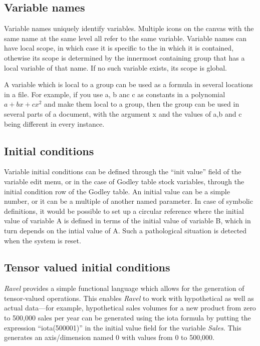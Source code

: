 \subsection{Variable names}

Variable names uniquely identify variables. Multiple icons on the
canvas with the same name at the same level all refer to the same
variable. Variable names can have local scope, in which case it
is specific to the  in which it is contained,
othewise its scope is determined by the innermost containing group
that has a local variable of that name. If no such variable exists,
its scope is global.

A variable which is local to a group can be used as a formula in
several locations in a file. For example, if you use a, b anc c as
constants in a polynomial $a+bx+cx^{2}$ and make them local to a
group, then the group can be used in several parts of a document, with
the argument x and the values of a,b and c being different in every
instance.

\subsection{Initial conditions}

\label{var:init}

Variable initial conditions can be defined through the ``init value''
field of the variable edit menu, or in the case of Godley table stock
variables, through the initial condition row of the Godley table.
An initial value can be a simple number, or it can be a multiple of
another named parameter. In case of symbolic definitions, it would
be possible to set up a circular reference where the initial value
of variable A is defined in terms of the initial value of variable
B, which in turn depends on the intial value of A. Such a pathological
situation is detected when the system is reset.

\subsection{Tensor valued initial conditions}

\label{tensor-init}

\emph{Ravel} provides a simple functional language which allows for
the generation of tensor-valued operations. This enables \emph{Ravel}
to work with hypothetical as well as actual data---for example, hypothetical
sales volumes for a new product from zero to 500,000 sales per year
can be generated using the iota formula by putting the expression
``iota(500001)'' in the initial value field for the variable \emph{Sales}.
This generates an axis/dimension named 0 with values from 0 to 500,000. 

